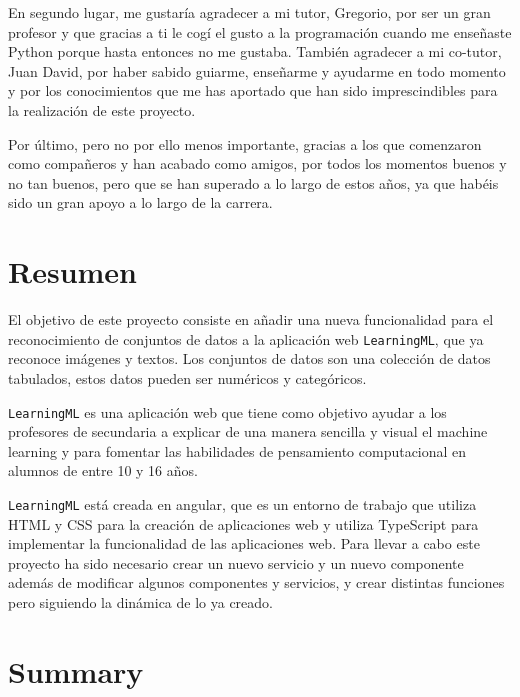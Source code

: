 \documentclass[a4paper, 12pt]{book}
\begin{document}
En segundo lugar, me gustaría agradecer a mi tutor, Gregorio, por ser un gran profesor y que gracias a ti le cogí el gusto a la programación cuando me enseñaste Python porque hasta entonces no me gustaba. También agradecer a mi co-tutor, Juan David, por haber sabido guiarme, enseñarme y ayudarme en todo momento y por los conocimientos que me has aportado que han sido imprescindibles para la realización de este proyecto.

Por último, pero no por ello menos importante, gracias a los que comenzaron como compañeros y han acabado como amigos, por todos los momentos buenos y no tan buenos, pero que se han superado a lo largo de estos años, ya que habéis sido un gran apoyo a lo largo de la carrera.



\chapter*{Resumen}

El objetivo de este proyecto consiste en añadir una nueva funcionalidad para el reconocimiento de conjuntos de datos a la aplicación web \texttt{LearningML}, que ya reconoce imágenes y textos. Los conjuntos de datos son una colección de datos tabulados, estos datos pueden ser numéricos y categóricos.

\texttt{LearningML} es una aplicación web que tiene como objetivo ayudar a los profesores de secundaria a explicar de una manera sencilla y visual el machine learning y para fomentar las habilidades de pensamiento computacional en alumnos de entre 10 y 16 años.

\texttt{LearningML} está creada en angular, que es un entorno de trabajo que utiliza HTML y CSS para la creación de aplicaciones web y utiliza TypeScript para implementar la funcionalidad de las aplicaciones web. Para llevar a cabo este proyecto ha sido necesario crear un nuevo servicio y un nuevo componente además de modificar algunos componentes y servicios, y crear distintas funciones pero siguiendo la dinámica de lo ya creado.


\chapter*{Summary}
\end{document}
